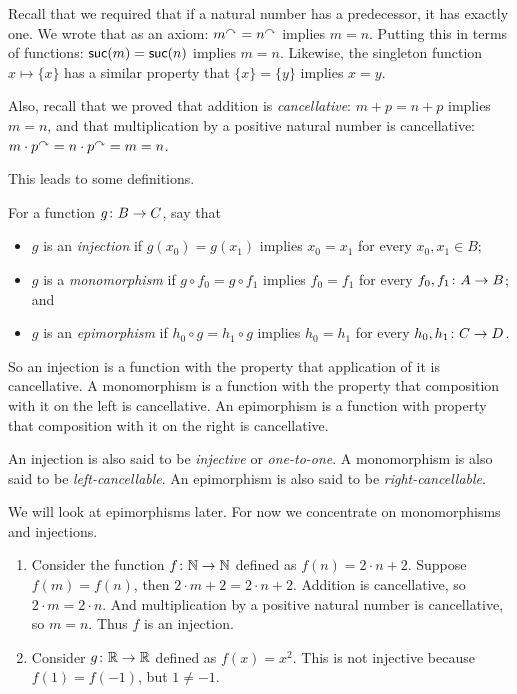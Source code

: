 Recall that we required that if a natural number has a predecessor, it has exactly one. 
We wrote that as an axiom: $m^\curvearrowright = n^\curvearrowright$ implies $m=n$.
Putting this in terms of functions: $\mathord{\textsf{suc}}(m) = \mathord{\textsf{suc}}(n)$ implies $m=n$.
Likewise, the singleton function $x\mapsto \{x\}$ has a similar property that $\{x\}=\{y\}$ implies $x= y$.

Also, recall that we proved that addition is \emph{cancellative}: $m+p = n+p$
implies $m=n$, and that multiplication by a positive natural number is cancellative:
$m\cdot p^\curvearrowright = n\cdot p^\curvearrowright = m=n$.

This leads to some definitions.

\begin{defn}
	For a function ${g}\colon{B}\to{C}$, say that
	\begin{itemize}
		\item $g$ is an \emph{injection} if $g(x_0)=g(x_1)$ implies $x_0=x_1$ for every $x_0,x_1\in B$;
		\item $g$ is a \emph{monomorphism} if  $g\circ f_0=g\circ f_1$ implies $f_0=f_1$ for every ${f_0,f_1}\colon{A}\to{B}$; and
		\item $g$ is an \emph{epimorphism} if  $h_0\circ g = h_1\circ g$ implies $h_0=h_1$ for every ${h_0,h_1}\colon{C}\to{D}$.
	\end{itemize}  
\end{defn}

So an injection is a function with the property that application of it is cancellative.
A monomorphism is a function with the property that composition with it on the left is cancellative. 
An epimorphism is a function with property that composition with it on the right is cancellative.

An injection is also said to be \emph{injective} or \emph{one-to-one}.
A monomorphism is also said to be \emph{left-cancellable}. 
An epimorphism is also said to be \emph{right-cancellable}.

We will look at epimorphisms later. For now we concentrate on monomorphisms and injections.

\printbreak
\begin{example}
	\begin{enumerate}
		\item Consider the function ${f}\colon{\mathbb N}\to{\mathbb N}$ defined as $f(n) = 2\cdot n  + 2$.
		Suppose $f(m)=f(n)$, then $2\cdot m + 2=2\cdot n+ 2$. 
		Addition is cancellative, so $2\cdot m=2\cdot n$. 
		And multiplication by a positive natural number is cancellative, so $m=n$.
		Thus $f$ is an injection.
		\item Consider ${g}\colon{\mathbb R}\to{\mathbb R}$ defined as $f(x) = x^2$. 
		This is not injective because $f(1)=f(-1)$, but $1\neq -1$.
	\end{enumerate}
\end{example}

